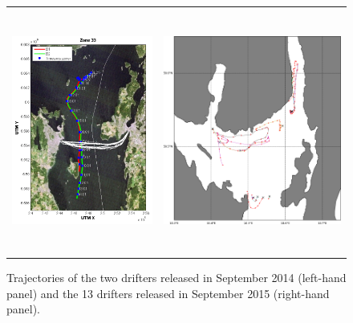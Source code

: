 \begin{figure}[htb]
  \begin{center}
    \begin{tabular}{cc}
      \includegraphics*[height=8cm]{Figurer/drifters_sept2014} & 
      \includegraphics*[height=8cm]{Figurer/drifters_low_crop} \\ 
    \end{tabular}
    \caption{\small Trajectories of the two drifters released in September 2014 (left-hand panel) and the 13 drifters released in September 2015 (right-hand panel).}
    \label{fig:drifters_tracks}
  \end{center}
\end{figure}

